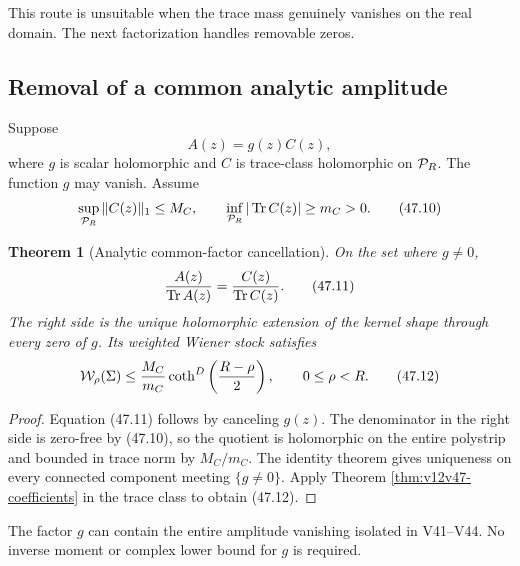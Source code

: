 \documentclass[11pt]{article}
\newtheorem{theorem}{Theorem}[section]
\theoremstyle{remark}
\begin{document}
This route is unsuitable when the trace mass genuinely vanishes on
the real domain.  The next factorization handles removable zeros.

\subsection{Removal of a common analytic amplitude}

Suppose
\begin{equation}
                         A(z)=g(z)C(z),           \tag{47.9}
\end{equation}
where \(g\) is scalar holomorphic and \(C\) is trace-class
holomorphic on \({\cal P}_R\).  The function \(g\) may vanish.
Assume
\begin{equation}
 \sup_{{\cal P}_R}\|C(z)\|_1\leq M_C,\qquad
 \inf_{{\cal P}_R}|\operatorname{Tr}C(z)|\geq m_C>0.
                                                        \tag{47.10}
\end{equation}

\begin{theorem}[Analytic common-factor cancellation]
\label{thm:v12v47-common-factor}
On the set where \(g\ne0\),
\begin{equation}
 {A(z)\over\operatorname{Tr}A(z)}
 =
 {C(z)\over\operatorname{Tr}C(z)}.               \tag{47.11}
\end{equation}
The right side is the unique holomorphic extension of the kernel
shape through every zero of \(g\).  Its weighted Wiener stock
satisfies
\begin{equation}
 {\cal W}_\rho(\Sigma)
 \leq
 {M_C\over m_C}
 \coth^D\left({R-\rho\over2}\right),
 \qquad 0\leq\rho<R.                             \tag{47.12}
\end{equation}
\end{theorem}

\begin{proof}
Equation (47.11) follows by canceling \(g(z)\).  The denominator in
the right side is zero-free by (47.10), so the quotient is
holomorphic on the entire polystrip and bounded in trace norm by
\(M_C/m_C\).  The identity theorem gives uniqueness on every
connected component meeting \(\{g\ne0\}\).  Apply Theorem
\ref{thm:v12v47-coefficients} in the trace class to obtain (47.12).
\end{proof}

The factor \(g\) can contain the entire amplitude vanishing isolated
in V41--V44.  No inverse moment or complex lower bound for \(g\) is
required.
\end{document}
